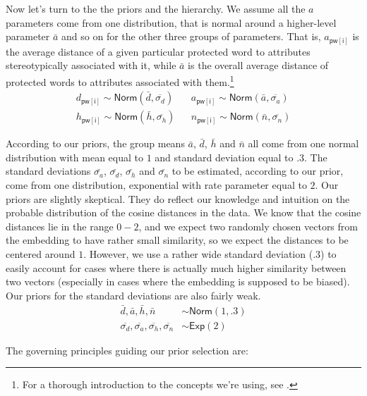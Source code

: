 \documentclass{clv3}
\begin{document}
Now let's turn to the the priors and the hierarchy. We assume all the \(a\) parameters
come from one distribution, that is normal around a higher-level
parameter \(\bar{a}\) and so on for the other three groups of
parameters. That is, \(a_{\mathsf{pw[i]}}\) is the average distance of a
given particular protected word to attributes stereotypically associated
with it, while \(\bar{a}\) is the overall average distance of protected
words to attributes associated with them.\footnote{For a thorough
  introduction to the concepts we're using, see \citep{kruschke2015bayesian,statrethinkingbook2020}.}
\begin{align*}
d_{\mathsf{pw[i]}} \sim \mathsf{Norm}(\bar{d}, \overline{\sigma_d}) &  & 
a_{\mathsf{pw[i]}} \sim \mathsf{Norm}(\bar{a}, \overline{\sigma_a}) \\
h_{\mathsf{pw[i]}} \sim \mathsf{Norm}(\bar{h}, \overline{\sigma_h}) & & 
n_{\mathsf{pw[i]}} \sim \mathsf{Norm}(\bar{n}, \overline{\sigma_n}) 
\end{align*}

According to our priors, the group means \(\bar{a}\), \(\bar{d}\),
\(\bar{h}\) and \(\bar{n}\) all come from one normal distribution with
mean equal to \(1\) and standard deviation equal to \(.3\). The standard
deviations \(\bar{\sigma_a}\), \(\bar{\sigma_d}\), \(\bar{\sigma_h}\)
and \(\bar{\sigma_n}\) to be estimated, according to our prior, come
from one distribution, exponential with rate parameter equal to \(2\).
Our priors are slightly skeptical. They do reflect our knowledge and
intuition on the probable distribution of the cosine distances in the
data. We know that the cosine distances lie in the range \(0-2\), and we
expect two randomly chosen vectors from the embedding to have rather
small similarity, so we expect the distances to be centered around
\(1\). However, we use a rather wide standard deviation (\(.3\)) to
easily account for cases where there is actually much higher similarity
between two vectors (especially in cases where the embedding is supposed
to be biased). Our priors for the standard deviations are also fairly
weak. \begin{align*}
\bar{d}, \bar{a}, \bar{h}, \bar{n} &\sim \mathsf{Norm}(1, .3)\\ 
\overline{\sigma_d}, \overline{\sigma_a},  \overline{\sigma_h},  \overline{\sigma_n}  &\sim \mathsf{Exp}(2)
\end{align*}


The governing principles guiding our prior selection are:
\end{document}
